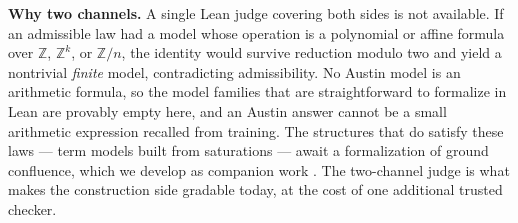 \textbf{Why two channels.} A single Lean judge covering both sides is not
available. If an admissible law had a model whose operation is a polynomial
or affine formula over $\mathbb{Z}$, $\mathbb{Z}^k$, or $\mathbb{Z}/n$, the
identity would survive reduction modulo two and yield a nontrivial
\emph{finite} model, contradicting admissibility. No Austin model is an
arithmetic formula, so the model families that are straightforward to
formalize in Lean are provably empty here, and an Austin answer cannot be a
small arithmetic expression recalled from training. The structures that do
satisfy these laws — term models built from saturations — await a
formalization of ground confluence, which we develop as companion work
\citep{janota2026case}. The two-channel judge is what makes the construction
side gradable today, at the cost of one additional trusted checker.

